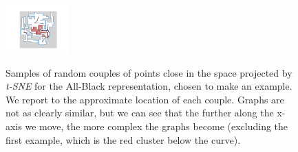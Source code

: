 \begin{figure}[hbt!]
{        \includegraphics[width=0.22\textwidth]{images/tsne_samples/gr42.png}
    }
    \qquad
    \qquad
    \caption[t-SNE graph similarity examples]{Samples of random couples of points close in the space projected by \textit{t-SNE} for the All-Black representation, chosen to make an example. We report to the approximate location of each couple. Graphs are not as clearly similar, but we can see that the further along the x-axis we move, the more complex the graphs become (excluding the first example, which is the red cluster below the curve).}
    \label{fig:tsne_graphs_examples}
\end{figure}

